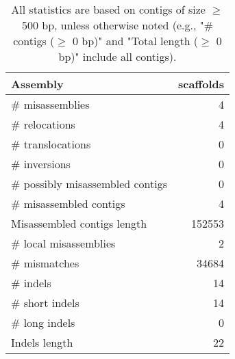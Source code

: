 \documentclass[12pt,a4paper]{article}
\begin{document}
\begin{table}[ht]
\begin{center}
\caption{All statistics are based on contigs of size $\geq$ 500 bp, unless otherwise noted (e.g., "\# contigs ($\geq$ 0 bp)" and "Total length ($\geq$ 0 bp)" include all contigs).}
\begin{tabular}{|l*{1}{|r}|}
\hline
Assembly & scaffolds \\ \hline
\# misassemblies & 4 \\ \hline
\hspace{5mm}\# relocations & 4 \\ \hline
\hspace{5mm}\# translocations & 0 \\ \hline
\hspace{5mm}\# inversions & 0 \\ \hline
\# possibly misassembled contigs & 0 \\ \hline
\# misassembled contigs & 4 \\ \hline
Misassembled contigs length & 152553 \\ \hline
\# local misassemblies & 2 \\ \hline
\# mismatches & 34684 \\ \hline
\# indels & 14 \\ \hline
\hspace{5mm}\# short indels & 14 \\ \hline
\hspace{5mm}\# long indels & 0 \\ \hline
Indels length & 22 \\ \hline
\end{tabular}
\end{center}
\end{table}
\end{document}
